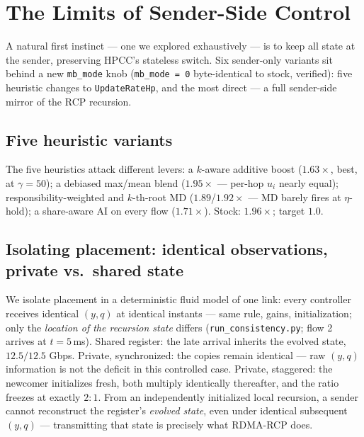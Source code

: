 \documentclass[conference]{IEEEtran}
\newcommand{\hpccfs}{\textsc{RDMA-RCP}\xspace}
\begin{document}
\section{The Limits of Sender-Side Control}
\label{sec:senderonly}

A natural first instinct --- one we explored exhaustively --- is to keep all state at the
sender, preserving HPCC's stateless switch. Six sender-only variants sit behind a new
\texttt{mb\_mode} knob (\texttt{mb\_mode = 0} byte-identical to stock, verified): five
heuristic changes to \texttt{UpdateRateHp}, and the most direct --- a full sender-side mirror
of the RCP recursion.

\subsection{Five heuristic variants}

The five heuristics attack different levers: a $k$-aware additive boost ($1.63\times$,
best, at $\gamma{=}50$); a debiased max/mean blend ($1.95\times$ --- per-hop $u_i$ nearly
equal); responsibility-weighted and $k$-th-root MD ($1.89$/$1.92\times$ --- MD barely fires
at $\eta$-hold); a share-aware AI on every flow ($1.71\times$). Stock: $1.96\times$;
target $1.0$.

\subsection{Isolating placement: identical observations, private vs.\ shared state}
\label{sec:isolate}

We isolate placement in a deterministic fluid model of one link: every controller receives
identical $(y, q)$ at identical instants --- same rule, gains, initialization; only the
\emph{location of the recursion state} differs (\texttt{run\_consistency.py}; flow 2
arrives at $t{=}5$\,ms). Shared register: the late arrival inherits the evolved state,
$12.5/12.5$ Gbps. Private, synchronized: the copies remain identical --- raw $(y, q)$ information is not the
deficit in this controlled case. Private,
staggered: the newcomer initializes fresh, both multiply identically thereafter, and the ratio
freezes at exactly $2{:}1$. From an independently initialized local recursion, a sender
cannot reconstruct the register's \emph{evolved state}, even under identical subsequent
$(y, q)$ --- transmitting that state is precisely what \hpccfs does.
\end{document}
